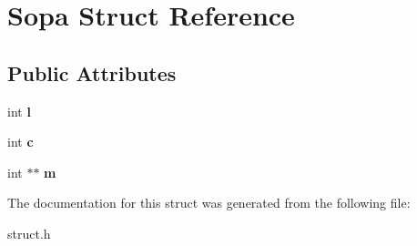 \hypertarget{structSopa}{\section{Sopa Struct Reference}
\label{structSopa}
}
\subsection*{Public Attributes}
\begin{DoxyCompactItemize}
\item 
\hypertarget{structSopa_addf515c78f39b43d933c9d959329ed57}{int {\bfseries l}}\label{structSopa_addf515c78f39b43d933c9d959329ed57}

\item 
\hypertarget{structSopa_a3276c203886b2e8d92638811dbe63c80}{int {\bfseries c}}\label{structSopa_a3276c203886b2e8d92638811dbe63c80}

\item 
\hypertarget{structSopa_a2d4b199b443a2c4e51d8ad13c8ba4567}{int $\ast$$\ast$ {\bfseries m}}\label{structSopa_a2d4b199b443a2c4e51d8ad13c8ba4567}

\end{DoxyCompactItemize}


The documentation for this struct was generated from the following file\-:\begin{DoxyCompactItemize}
\item 
struct.\-h\end{DoxyCompactItemize}

